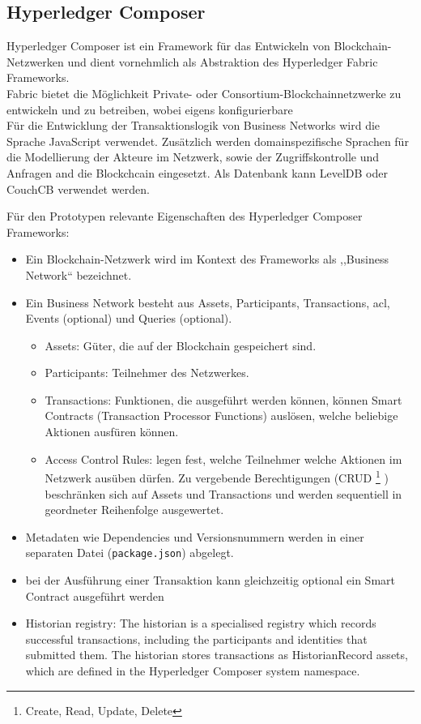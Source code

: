 \subsection{Hyperledger Composer}
        Hyperledger Composer ist ein Framework für das Entwickeln von Blockchain-Netzwerken und dient vornehmlich als Abstraktion des Hyperledger Fabric Frameworks. 
        \medskip\\
        Fabric bietet die Möglichkeit Private- oder Consortium-Blockchainnetzwerke zu entwickeln und zu betreiben, wobei eigens konfigurierbare 
        \medskip\\
        \noindent Für die Entwicklung der Transaktionslogik von Business Networks wird die Sprache JavaScript verwendet. 
        Zusätzlich werden domainspezifische Sprachen für die Modellierung der Akteure im Netzwerk, sowie der Zugriffskontrolle und Anfragen and die Blockchcain eingesetzt.
        Als Datenbank kann LevelDB oder CouchCB verwendet werden. 
        
        \noindent Für den Prototypen relevante Eigenschaften des Hyperledger Composer Frameworks:
        \begin{itemize}[noitemsep]
            \item Ein Blockchain-Netzwerk wird im Kontext des Frameworks als ,,Business Network`` bezeichnet. 
            \item Ein Business Network besteht aus Assets, Participants, Transactions, \gls{acl}, Events (optional) und Queries (optional).
                \begin{itemize}[noitemsep]
                    \item Assets: Güter, die auf der Blockchain gespeichert sind.
                    \item Participants: Teilnehmer des Netzwerkes.
                    \item Transactions: Funktionen, die ausgeführt werden können, können Smart Contracts (Transaction Processor Functions) auslösen, welche beliebige Aktionen ausfüren können. 
                    \item Access Control Rules: legen fest, welche Teilnehmer welche Aktionen im Netzwerk ausüben dürfen. 
                        Zu vergebende Berechtigungen (CRUD
                        \!\footnote{Create, Read, Update, Delete}
                        ) beschränken sich auf Assets und Transactions und werden sequentiell in geordneter Reihenfolge ausgewertet. 
                \end{itemize}
            \item Metadaten wie Dependencies und Versionsnummern werden in einer separaten Datei (\colorbox{light-gray}{\lstinline|package.json|}) abgelegt.
            \item bei der Ausführung einer Transaktion kann gleichzeitig optional ein Smart Contract ausgeführt werden
            \item Historian registry: The historian is a specialised registry which records successful transactions, including the participants and identities that submitted them. 
            The historian stores transactions as HistorianRecord assets, which are defined in the Hyperledger Composer system namespace.
        \end{itemize}
        
